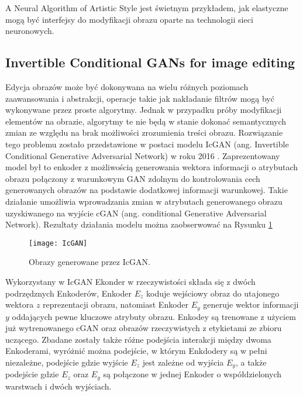     A Neural Algorithm of Artistic Style jest świetnym przykładem, jak elastyczne
    mogą być interfejsy do modyfikacji obrazu oparte na technologii sieci neuronowych.

  \subsection{Invertible Conditional GANs for image editing}
    Edycja obrazów może być dokonywana na wielu różnych poziomach zaawansowania
    i abstrakcji, operacje takie jak nakładanie filtrów mogą być
    wykonywane przez proste algorytmy. Jednak w przypadku próby modyfikacji
    elementów na obrazie, algorytmy te nie będą w stanie dokonać semantycznych
    zmian ze względu na brak możliwości zrozumienia treści obrazu. Rozwiązanie
    tego problemu zostało przedstawione w postaci modelu IcGAN
    (ang. Invertible Conditional Generative Adversarial Network) w roku 2016
    \cite{gan_editing}. Zaprezentowany model był to enkoder z możliwością
    generowania wektora informacji o atrybutach obrazu połączony z warunkowym
    GAN zdolnym do kontrolowania cech generowanych obrazów na podstawie dodatkowej
    informacji warunkowej. Takie działanie umożliwia wprowadzania zmian w
    atrybutach generowanego obrazu uzyskiwanego na wyjście cGAN (ang. conditional Generative
    Adversarial Network). Rezultaty działania modelu można zaobserwować na
    Rysunku \ref{fig:IcGAN}

    \begin{figure}[ht]
      \centering
      \texttt{[image: IcGAN]}
      \caption{Obrazy generowane przez IcGAN.}
      \label{fig:IcGAN}
    \end{figure}

    Wykorzystany w IcGAN Ekonder w rzeczywistości składa się z dwóch podrzędznych
    Enkoderów, Enkoder $E_{z}$ koduje wejściowy obraz do utajonego wektora $z$ reprezentacji
    obrazu, natomiast Enkoder $E_{y}$ generuje wektor informacji $y$ oddających
    pewne kluczowe atrybuty obrazu. Enkodey są trenowane z użyciem już wytrenowanego
    cGAN oraz obrazów rzeczywistych z etykietami ze zbioru uczącego. Zbadane
    zostały także różne podejścia interakcji między dwoma Enkoderami, wyróżnić
    można podejście, w którym Enkdodery są w pełni niezależne, podejście
    gdzie wyjście $E_{z}$ jest zależne od wyjścia $E_{y}$, a także podejście
    gdzie $E_{z}$ oraz $E_{y}$ są połączone w jednej Enkoder o współdzielonych
    warstwach i dwóch wyjściach.

